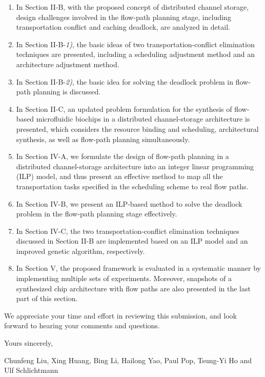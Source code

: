 \begin{table*}
\begin{center}
\begin{minipage}[t][21.5cm][t]{13.8cm}
\begin{enumerate}
\item In Section II-B, with the proposed concept of distributed channel storage, design challenges involved in the flow-path planning stage, including transportation conflict and caching deadlock, are analyzed in detail.

\item In Section II-B-\textsl{1)}, the basic ideas of two transportation-conflict elimination techniques are presented, including a scheduling adjustment method and an architecture adjustment method.

\item In Section II-B-\textsl{2)}, the basic idea for solving the deadlock problem in flow-path planning is discussed.

\item In Section II-C, an updated problem formulation for the synthesis of flow-based microfluidic biochips in a distributed channel-storage architecture is presented, which considers the resource binding and scheduling, architectural synthesis, as well as flow-path planning simultaneously.

\item In Section IV-A, we formulate the design of flow-path planning in a distributed channel-storage architecture into an  integer linear programming (ILP) model, and thus present an effective method to map all the transportation tasks specified in the scheduling scheme to real flow paths.

\item In Section IV-B, we present an ILP-based method to solve the deadlock problem in the flow-path planning stage effectively.

\item In Section IV-C, the two transportation-conflict elimination techniques discussed in Section II-B are implemented based on an ILP model and an improved genetic algorithm, respectively.

\item In Section V, the proposed framework is evaluated in a systematic manner by implementing multiple sets of experiments. Moreover, snapshots of a synthesized chip architecture
    with flow paths are also presented in the last part of this section.

\end{enumerate}

\vspace{10pt}

We appreciate your time and effort in reviewing this submission, and look forward to hearing your comments and questions.


\vspace{15pt}

Yours sincerely,

\vspace{15pt}

Chunfeng Liu, Xing Huang, Bing Li, Hailong Yao, Paul Pop, Tsung-Yi Ho and Ulf Schlichtmann

\end{minipage}
\end{center}
\end{table*}

\clearpage
\setcounter{page}{0}
